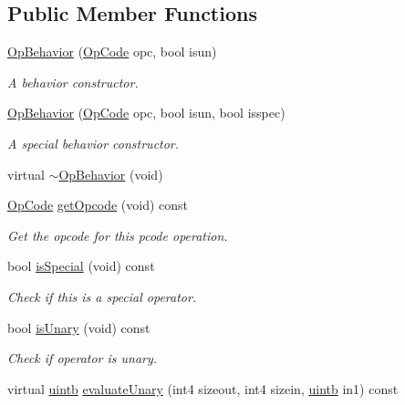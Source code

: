 \subsection*{Public Member Functions}
\begin{DoxyCompactItemize}
\item 
\mbox{\hyperlink{class_op_behavior_a2cfe8e17b3746132a974e865938e5637}{Op\+Behavior}} (\mbox{\hyperlink{opcodes_8hh_abeb7dfb0e9e2b3114e240a405d046ea7}{Op\+Code}} opc, bool isun)
\begin{DoxyCompactList}\small\item\em A behavior constructor. \end{DoxyCompactList}\item 
\mbox{\hyperlink{class_op_behavior_a67274f01b410ac3dd5e767b07c2f74fb}{Op\+Behavior}} (\mbox{\hyperlink{opcodes_8hh_abeb7dfb0e9e2b3114e240a405d046ea7}{Op\+Code}} opc, bool isun, bool isspec)
\begin{DoxyCompactList}\small\item\em A special behavior constructor. \end{DoxyCompactList}\item 
virtual \mbox{\hyperlink{class_op_behavior_ab1a0bf0919773aa789b1e5e7037f2325}{$\sim$\+Op\+Behavior}} (void)
\item 
\mbox{\hyperlink{opcodes_8hh_abeb7dfb0e9e2b3114e240a405d046ea7}{Op\+Code}} \mbox{\hyperlink{class_op_behavior_ad18c6673c9092dbfe3459224093998e8}{get\+Opcode}} (void) const
\begin{DoxyCompactList}\small\item\em Get the opcode for this pcode operation. \end{DoxyCompactList}\item 
bool \mbox{\hyperlink{class_op_behavior_ae7d553131d5eff60ff3e2f15c072a8af}{is\+Special}} (void) const
\begin{DoxyCompactList}\small\item\em Check if this is a special operator. \end{DoxyCompactList}\item 
bool \mbox{\hyperlink{class_op_behavior_a44a9dd4be5e4a4ccde3be993dc308033}{is\+Unary}} (void) const
\begin{DoxyCompactList}\small\item\em Check if operator is unary. \end{DoxyCompactList}\item 
virtual \mbox{\hyperlink{types_8h_a2db313c5d32a12b01d26ac9b3bca178f}{uintb}} \mbox{\hyperlink{class_op_behavior_acd4f5a1c0dee0414f3c541620b88fe45}{evaluate\+Unary}} (int4 sizeout, int4 sizein, \mbox{\hyperlink{types_8h_a2db313c5d32a12b01d26ac9b3bca178f}{uintb}} in1) const

\end{DoxyCompactItemize}
